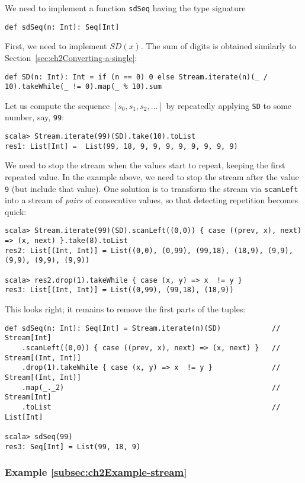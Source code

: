 We need to implement a function \lstinline!sdSeq! having the type
signature
\begin{lstlisting}
def sdSeq(n: Int): Seq[Int]
\end{lstlisting}
First, we need to implement $SD(x)$. The sum of digits is obtained
similarly to Section~\ref{sec:ch2Converting-a-single}:
\begin{lstlisting}
def SD(n: Int): Int = if (n == 0) 0 else Stream.iterate(n)(_ / 10).takeWhile(_ != 0).map(_ % 10).sum
\end{lstlisting}
Let us compute the sequence $\left[s_{0},s_{1},s_{2},...\right]$
by repeatedly applying \lstinline!SD! to some number, say, \lstinline!99!:
\begin{lstlisting}
scala> Stream.iterate(99)(SD).take(10).toList
res1: List[Int] =  List(99, 18, 9, 9, 9, 9, 9, 9, 9, 9)
\end{lstlisting}
We need to stop the stream when the values start to repeat, keeping
the first repeated value. In the example above, we need to stop the
stream after the value \lstinline!9! (but include that value). One
solution is to transform the stream via \lstinline!scanLeft! into
a stream of \emph{pairs} of consecutive values, so that detecting
repetition becomes quick:
\begin{lstlisting}
scala> Stream.iterate(99)(SD).scanLeft((0,0)) { case ((prev, x), next) => (x, next) }.take(8).toList
res2: List[(Int, Int)] = List((0,0), (0,99), (99,18), (18,9), (9,9), (9,9), (9,9), (9,9))

scala> res2.drop(1).takeWhile { case (x, y) => x  != y }
res3: List[(Int, Int)] = List((0,99), (99,18), (18,9))
\end{lstlisting}
This looks right; it remains to remove the first parts of the tuples:
\begin{lstlisting}
def sdSeq(n: Int): Seq[Int] = Stream.iterate(n)(SD)            // Stream[Int]
    .scanLeft((0,0)) { case ((prev, x), next) => (x, next) }   // Stream[(Int, Int)]
    .drop(1).takeWhile { case (x, y) => x  != y }              // Stream[(Int, Int)]
    .map(_._2)                                                 // Stream[Int]
    .toList                                                    // List[Int]

scala> sdSeq(99)
res3: Seq[Int] = List(99, 18, 9)
\end{lstlisting}


\subsubsection{Example \label{subsec:ch2Example-stream}\ref{subsec:ch2Example-stream}}


